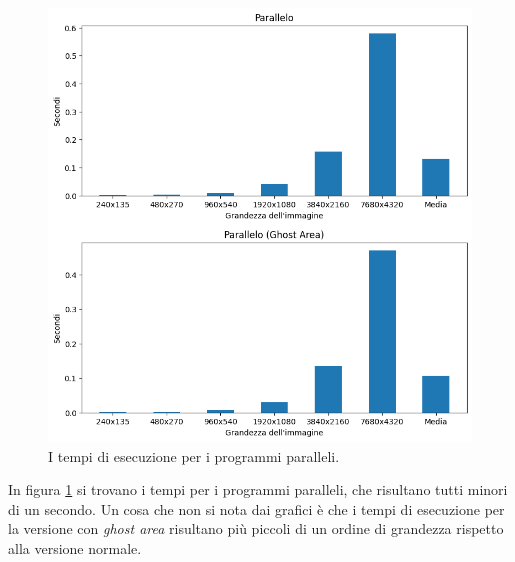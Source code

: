 \documentclass[12pt,a4paper,openright,twoside]{report}
\begin{document}
\begin{figure}[h]
    \centering
    \includegraphics[width=\textwidth]{graphs_parallel.png}
    \caption{I tempi di esecuzione per i programmi paralleli.}
    \label{img:times_par}
\end{figure}

In figura \ref{img:times_par} si trovano i tempi per i programmi paralleli, che risultano tutti minori di un secondo. Un cosa che non si nota dai grafici è che i tempi di esecuzione per la versione con \textit{ghost area} risultano più piccoli di un ordine di grandezza rispetto alla versione normale.
\end{document}
